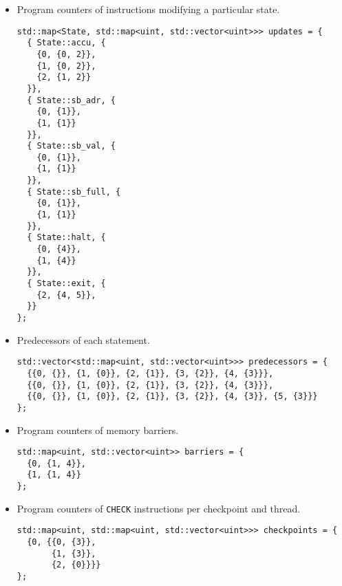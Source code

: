 \begin{itemize}
\item Program counters of instructions modifying a particular state.
\begin{lstlisting}[style=c++]
std::map<State, std::map<uint, std::vector<uint>>> updates = {
  { State::accu, {
    {0, {0, 2}},
    {1, {0, 2}},
    {2, {1, 2}}
  }},
  { State::sb_adr, {
    {0, {1}},
    {1, {1}}
  }},
  { State::sb_val, {
    {0, {1}},
    {1, {1}}
  }},
  { State::sb_full, {
    {0, {1}},
    {1, {1}}
  }},
  { State::halt, {
    {0, {4}},
    {1, {4}}
  }},
  { State::exit, {
    {2, {4, 5}},
  }}
};
\end{lstlisting}

\item Predecessors of each statement.
\begin{lstlisting}[style=c++]
std::vector<std::map<uint, std::vector<uint>>> predecessors = {
  {{0, {}}, {1, {0}}, {2, {1}}, {3, {2}}, {4, {3}}},
  {{0, {}}, {1, {0}}, {2, {1}}, {3, {2}}, {4, {3}}},
  {{0, {}}, {1, {0}}, {2, {1}}, {3, {2}}, {4, {3}}, {5, {3}}}
};
\end{lstlisting}

\item Program counters of memory barriers.
\begin{lstlisting}[style=c++]
std::map<uint, std::vector<uint>> barriers = {
  {0, {1, 4}},
  {1, {1, 4}}
};
\end{lstlisting}

\item Program counters of \lstinline[language={[concubine]Assembler}]{CHECK} instructions per checkpoint and thread.
\begin{lstlisting}[style=c++]
std::map<uint, std::map<uint, std::vector<uint>>> checkpoints = {
  {0, {{0, {3}},
       {1, {3}},
       {2, {0}}}}
};
\end{lstlisting}
\end{itemize}


